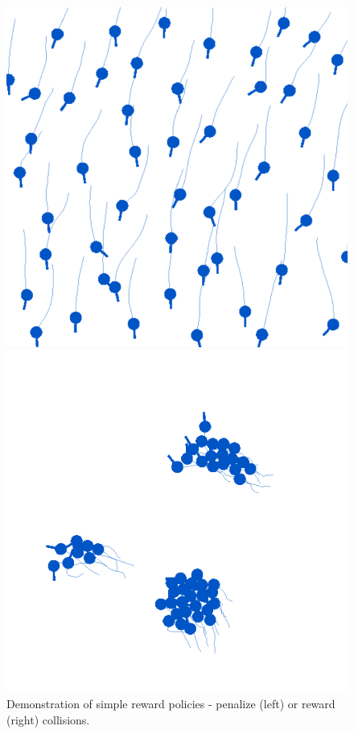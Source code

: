 \documentclass[9pt]{IEEEtran}
\begin{document}
\begin{figure}[hbt]
    \centering
    \begin{minipage}{0.2\textwidth}
        \centering
        \includegraphics[width=\textwidth]{avoid.png}
    \end{minipage}
    \hspace{0.5cm}
    \begin{minipage}{0.2\textwidth}
        \centering
        \includegraphics[width=\textwidth]{touch.png}
    \end{minipage}
    \caption{Demonstration of simple reward policies - penalize (left) or reward (right) collisions.}
    \label{fig:demo}
\end{figure}
\end{document}
